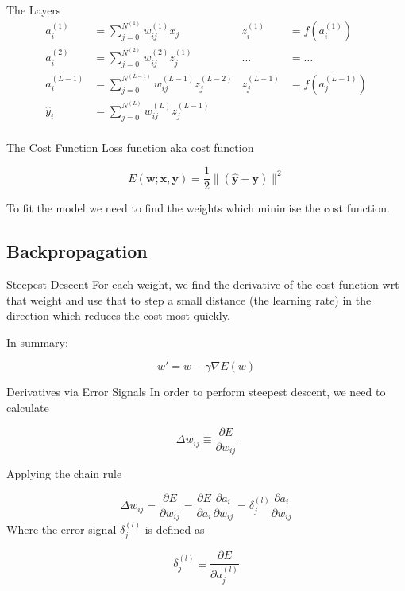 \documentclass{beamer}
\begin{document}
\begin{frame}[fragile]{The Layers}
$$
\begin{aligned}
a_i^{(1)}   &= \sum_{j=0}^{N^{(1)}} w_{ij}^{(1)} x_j       & z_i^{(1)} &= f(a_i^{(1)}) \\
a_i^{(2)}   &= \sum_{j=0}^{N^{(2)}} w_{ij}^{(2)} z_j^{(1)} &  \dots     &= \ldots \\
a_i^{(L-1)} &= \sum_{j=0}^{N^{(L-1)}} w_{ij}^{(L-1)} z_j^{(L-2)} & z_j^{(L-1)} &= f(a_j^{(L-1)}) \\
\hat{y}_i  &= \sum_{j=0}^{N^{(L)}} w_{ij}^{(L)} z_j^{(L-1)} \\
\end{aligned}
$$
\end{frame}

\begin{frame}[fragile]{The Cost Function}
Loss function aka cost function

$$
E(\boldsymbol{w}; \boldsymbol{x}, \boldsymbol{y}) = \frac{1}{2}\|(\hat{\boldsymbol{y}} - \boldsymbol{y})\|^2
$$

To fit the model we need to find the weights which minimise the cost
function.
\end{frame}

\subsection{Backpropagation}

\begin{frame}[fragile]{Steepest Descent}
For each weight, we find the derivative of the cost function wrt that
weight and use that to step a small distance (the learning rate) in
the direction which reduces the cost most quickly.

In summary:

$$
w' = w - \gamma\nabla E(w)
$$
\end{frame}

\begin{frame}[fragile]{Derivatives via Error Signals}
In order to perform steepest descent, we need to calculate

$$
\Delta w_{ij} \equiv \frac{\partial E}{\partial w_{ij}}
$$

Applying the chain rule

$$
\Delta w_{ij} =
\frac{\partial E}{\partial w_{ij}} =
\frac{\partial E}{\partial a_i}\frac{\partial a_i}{\partial w_{ij}} =
\delta_j^{(l)}\frac{\partial a_i}{\partial w_{ij}}
$$
Where the error signal $\delta_j^{(l)}$ is defined as

$$
\delta_j^{(l)} \equiv
\frac{\partial E}{\partial a_j^{(l)}}
$$
\end{frame}
\end{document}
